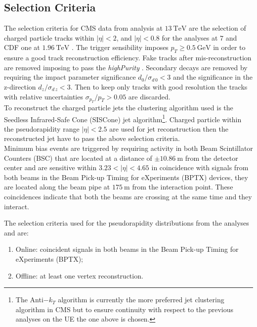 
\subsection{Selection Criteria}

The selection criteria for CMS data from analysis at $13\ \mathrm{TeV}$ \cite{CMS-PAS-FSQ-15-007} are the selection of charged particle tracks within $|\eta| < 2$, and  $|\eta|<0.8$ for the analyses at $7$ \cite{CMS-PAS-FSQ-12-020} and CDF one at $1.96\ \mathrm{TeV}$ \cite{CDF:2015txs}. The trigger sensibility imposes $p_T \geq 0.5\ \mathrm{GeV}$ in order to ensure a good track reconstruction efficiency. Fake tracks after mis-reconstruction are removed imposing to pass the \textit{highPurity} \cite{HighPurity}. Secondary decays are removed by requiring the impact parameter significance $d_0/\sigma_{d\,0} < 3$ and the significance in the z-direction $d_z/\sigma_{d\,z} < 3$. Then to keep only tracks with good resolution the tracks with relative uncertainties $\sigma_{p_T}/p_T > 0.05$ are discarded.
\\
To reconstruct the charged particle jets the clustering algorithm used is the Seedless Infrared-Safe Cone (SISCone) \cite{JetAlgorithm1} jet algorithm\footnote{The Anti$-k_T$ algorithm \cite{JetAlgorithm2} is currently the more preferred jet clustering algorithm in CMS but to ensure continuity with respect to the previous analyses on the UE the one above is chosen.}. Charged particle within the pseudorapidity range $|\eta|<2.5$ are used for jet reconstruction then the reconstructed jet have to pass the above selection criteria.
\\
Minimum bias events are triggered by requiring activity in both Beam Scintillator Counters (BSC) that are located at a distance of $\pm10.86\ \mathrm{m}$ from the detector center and are sensitive within $3.23 < |\eta| < 4.65$ in coincidence with signals from both beams in the Beam Pick-up Timing for eXperiments (BPTX) devices, they are located along the beam pipe at $175\ \mathrm{m}$ from the interaction point. These coincidences indicate that both the beams are crossing at the same time and they interact.

The selection criteria used for the pseudorapidity distributions from the analyses \cite{CMS:2018nhd} and \cite{CMS:2015zrm} are: 
\begin{enumerate}
	\item Online: coincident signals in both beams in the Beam Pick-up Timing for eXperiments (BPTX);
	\item Offline: at least one vertex reconstruction.
\end{enumerate}

